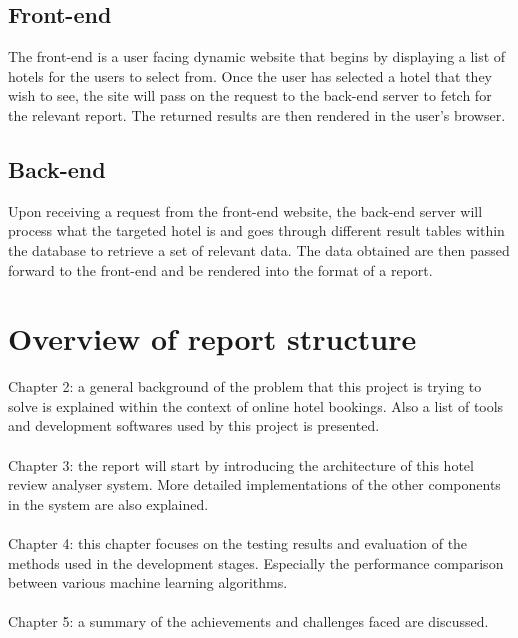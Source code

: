 \documentclass[a4paper]{report}
\begin{document}
\subsection{Front-end}
The front-end is a user facing dynamic website that begins by displaying a list of hotels for the users to select from. Once the user has selected a hotel that they wish to see, the site will pass on the request to the back-end server to fetch for the relevant report. The returned results are then rendered in the user's browser.

\subsection{Back-end}
Upon receiving a request from the front-end website, the back-end server will process what the targeted hotel is and goes through different result tables within the database to retrieve a set of relevant data. The data obtained are then passed forward to the front-end and be rendered into the format of a report. 

\section{Overview of report structure}
Chapter 2: a general background of the problem that this project is trying to solve is explained within the context of online hotel bookings. Also a list of tools and development softwares used by this project is presented.
\\\\
Chapter 3: the report will start by introducing the architecture of this hotel review analyser system. More detailed implementations of the other components in the system are also explained.
\\\\
Chapter 4: this chapter focuses on the testing results and evaluation of the methods used in the development stages. Especially the performance comparison between various machine learning algorithms.
\\\\
Chapter 5: a summary of the achievements and challenges faced are discussed.
\end{document}
